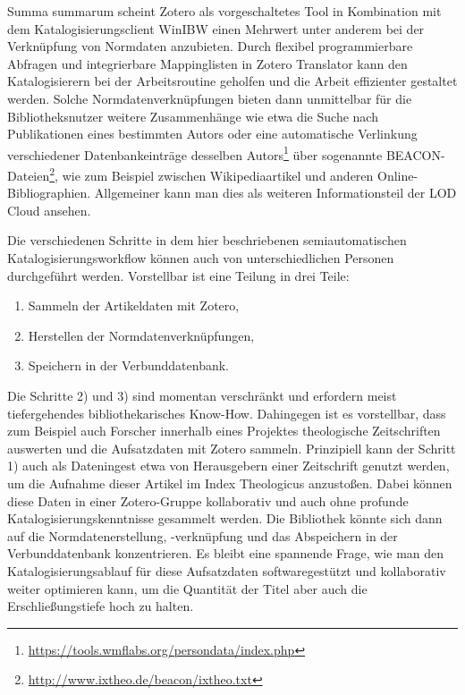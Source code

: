 \documentclass[a4paper,
fontsize=11pt,
oneside,
numbers=noperiodatend,
parskip=half-,
bibliography=totoc,
final
]{scrartcl}
\begin{document}
Summa summarum scheint Zotero als vorgeschaltetes Tool in Kombination
mit dem Katalogisierungsclient WinIBW einen Mehrwert unter anderem bei
der Verknüpfung von Normdaten anzubieten. Durch flexibel programmierbare
Abfragen und integrierbare Mappinglisten in Zotero Translator kann den
Katalogisierern bei der Arbeitsroutine geholfen und die Arbeit
effizienter gestaltet werden. Solche Normdatenverknüpfungen bieten dann
unmittelbar für die Bibliotheksnutzer weitere Zusammenhänge wie etwa die
Suche nach Publikationen eines bestimmten Autors oder eine automatische
Verlinkung verschiedener Datenbankeinträge desselben Autors\footnote{\url{https://tools.wmflabs.org/persondata/index.php}}
über sogenannte BEACON-Dateien\footnote{\url{http://www.ixtheo.de/beacon/ixtheo.txt}},
wie zum Beispiel zwischen Wikipediaartikel und anderen
Online-Bibliographien. Allgemeiner kann man dies als weiteren
Informationsteil der LOD Cloud ansehen.

Die verschiedenen Schritte in dem hier beschriebenen semiautomatischen
Katalogisierungsworkflow können auch von unterschiedlichen Personen
durchgeführt werden. Vorstellbar ist eine Teilung in drei Teile:

\begin{enumerate}
\def\labelenumi{\arabic{enumi}.}
\item
  Sammeln der Artikeldaten mit Zotero,
\item
  Herstellen der Normdatenverknüpfungen,
\item
  Speichern in der Ver\-bund\-daten\-bank.
\end{enumerate}

Die Schritte 2) und 3) sind momentan verschränkt und erfordern meist
tiefergehendes bibliothekarisches Know-How. Dahingegen ist es
vorstellbar, dass zum Beispiel auch Forscher innerhalb eines Projektes
theologische Zeitschriften auswerten und die Aufsatzdaten mit Zotero
sammeln. Prinzipiell kann der Schritt 1) auch als Dateningest etwa von
Herausgebern einer Zeitschrift genutzt werden, um die Aufnahme dieser
Artikel im Index Theologicus anzustoßen. Dabei können diese Daten in
einer Zotero-Gruppe kollaborativ und auch ohne profunde
Katalogisierungskenntnisse gesammelt werden. Die Bibliothek könnte sich
dann auf die Normdatenerstellung, -verknüpfung und das Abspeichern in
der Ver\-bund\-daten\-bank konzentrieren. Es bleibt eine spannende Frage, wie
man den Katalogisierungsablauf für diese Aufsatzdaten softwaregestützt
und kollaborativ weiter optimieren kann, um die Quantität der Titel aber
auch die Erschließungstiefe hoch zu halten.
\end{document}
